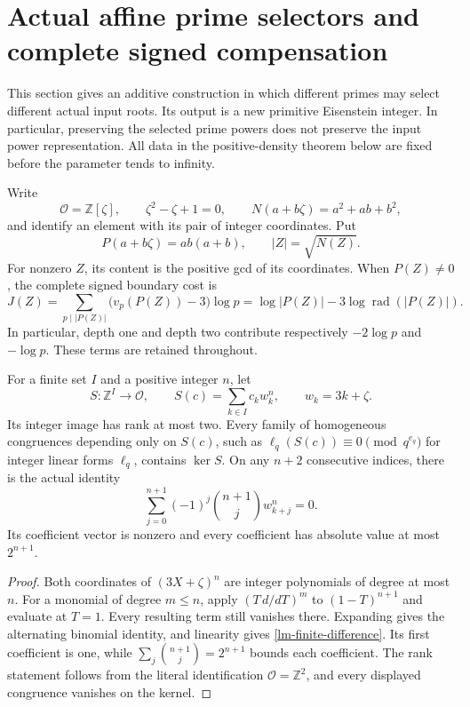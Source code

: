 \section{Actual affine prime selectors and complete signed compensation}
\label{sec:affine-owner-selectors}

This section gives an additive construction in which different primes
may select different actual input roots. Its output is a new primitive
Eisenstein integer. In particular, preserving the selected prime powers
does not preserve the input power representation. All data in the
positive-density theorem below are fixed before the parameter tends
to infinity.

Write
\[
 \mathcal O=\mathbb Z[\zeta],\qquad \zeta^2-\zeta+1=0,
 \qquad N(a+b\zeta)=a^2+ab+b^2,
\]
and identify an element with its pair of integer coordinates. Put
\[
 P(a+b\zeta)=ab(a+b),\qquad |Z|=\sqrt{N(Z)}.
\]
For nonzero \(Z\), its content is the positive gcd of its coordinates.
When \(P(Z)\ne0\), the complete signed boundary cost is
\begin{equation}
 J(Z)=\sum_{p\mid |P(Z)|}\bigl(v_p(P(Z))-3\bigr)\log p
     =\log|P(Z)|-3\log\operatorname{rad}(|P(Z)|).
 \label{lm-signed-cost}
\end{equation}
In particular, depth one and depth two contribute respectively
\(-2\log p\) and \(-\log p\). These terms are retained throughout.

\begin{proposition}
\label{lm-additive-kernel}
For a finite set \(I\) and a positive integer \(n\), let
\[
 S:\mathbb Z^I\longrightarrow\mathcal O,\qquad
 S(c)=\sum_{k\in I}c_k w_k^n,\qquad w_k=3k+\zeta.
\]
Its integer image has rank at most two. Every family of homogeneous
congruences depending only on \(S(c)\), such as
\(\ell_q(S(c))\equiv0\pmod {q^{e_q}}\) for integer linear forms
\(\ell_q\), contains \(\ker S\). On any \(n+2\) consecutive indices,
there is the actual identity
\begin{equation}
 \sum_{j=0}^{n+1}(-1)^j\binom{n+1}{j}w_{k+j}^{n}=0.
 \label{lm-finite-difference}
\end{equation}
Its coefficient vector is nonzero and every coefficient has absolute
value at most \(2^{n+1}\).
\end{proposition}
\begin{proof}
Both coordinates of \((3X+\zeta)^n\) are integer polynomials of degree
at most \(n\). For a monomial of degree \(m\le n\), apply
\((T\,d/dT)^m\) to \((1-T)^{n+1}\) and evaluate at \(T=1\).
Every resulting term still vanishes there. Expanding gives the
alternating binomial identity, and linearity gives
\eqref{lm-finite-difference}. Its first coefficient is one, while
\(\sum_j\binom{n+1}{j}=2^{n+1}\) bounds each coefficient.
The rank statement follows from the literal identification
\(\mathcal O=\mathbb Z^2\), and every displayed congruence vanishes
on the kernel.
\end{proof}

